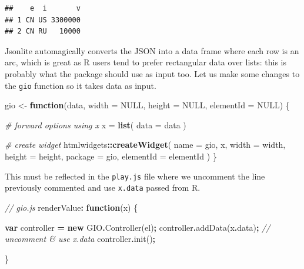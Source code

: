 \documentclass[
]{krantz}
\makeatletter
\newenvironment{Shaded}{\begin{snugshade}}{\end{snugshade}}
\newcommand{\AttributeTok}[1]{\textcolor[rgb]{0.61,0.61,0.61}{#1}}
\newcommand{\CommentTok}[1]{\textcolor[rgb]{0.37,0.37,0.37}{\textit{#1}}}
\newcommand{\ControlFlowTok}[1]{\textcolor[rgb]{0.27,0.27,0.27}{\textbf{#1}}}
\newcommand{\DataTypeTok}[1]{\textcolor[rgb]{0.27,0.27,0.27}{#1}}
\newcommand{\FunctionTok}[1]{\textcolor[rgb]{0,0,0}{#1}}
\newcommand{\KeywordTok}[1]{\textcolor[rgb]{0.27,0.27,0.27}{\textbf{#1}}}
\newcommand{\NormalTok}[1]{#1}
\newcommand{\OperatorTok}[1]{\textcolor[rgb]{0.43,0.43,0.43}{\textbf{#1}}}
\newcommand{\OtherTok}[1]{\textcolor[rgb]{0.37,0.37,0.37}{#1}}
\newcommand{\StringTok}[1]{\textcolor[rgb]{0.5,0.5,0.5}{#1}}
\newenvironment{kframe}{%
\medskip{}
\setlength{\fboxsep}{.8em}
 \def\at@end@of@kframe{}%
 \ifinner\ifhmode%
  \def\at@end@of@kframe{\end{minipage}}%
  \begin{minipage}{\columnwidth}%
 \fi\fi%
 \def\FrameCommand##1{\hskip\@totalleftmargin \hskip-\fboxsep
 \colorbox{shadecolor}{##1}\hskip-\fboxsep
     \hskip-\linewidth \hskip-\@totalleftmargin \hskip\columnwidth}%
 \MakeFramed {\advance\hsize-\width
   \@totalleftmargin\z@ \linewidth\hsize
   \@setminipage}}%
 {\par\unskip\endMakeFramed%
 \at@end@of@kframe}
\renewenvironment{Shaded}{\begin{kframe}}{\end{kframe}}
\makeatother
\begin{document}
\begin{verbatim}
##    e  i       v
## 1 CN US 3300000
## 2 CN RU   10000
\end{verbatim}

Jsonlite automagically converts the JSON into a data frame where each row is an arc, which is great as R users tend to prefer rectangular data over lists: this is probably what the package should use as input too. Let us make some changes to the \texttt{gio} function so it takes data as input.

\begin{Shaded}
\begin{Highlighting}[]
\NormalTok{gio \textless{}{-}}\StringTok{ }\ControlFlowTok{function}\NormalTok{(data, }\DataTypeTok{width =} \OtherTok{NULL}\NormalTok{, }\DataTypeTok{height =} \OtherTok{NULL}\NormalTok{, }\DataTypeTok{elementId =} \OtherTok{NULL}\NormalTok{) \{}

  \CommentTok{\# forward options using x}
\NormalTok{  x =}\StringTok{ }\KeywordTok{list}\NormalTok{(}
    \DataTypeTok{data =}\NormalTok{ data}
\NormalTok{  )}

  \CommentTok{\# create widget}
\NormalTok{  htmlwidgets}\OperatorTok{::}\KeywordTok{createWidget}\NormalTok{(}
    \DataTypeTok{name =} \StringTok{\textquotesingle{}gio\textquotesingle{}}\NormalTok{,}
\NormalTok{    x,}
    \DataTypeTok{width =}\NormalTok{ width,}
    \DataTypeTok{height =}\NormalTok{ height,}
    \DataTypeTok{package =} \StringTok{\textquotesingle{}gio\textquotesingle{}}\NormalTok{,}
    \DataTypeTok{elementId =}\NormalTok{ elementId}
\NormalTok{  )}
\NormalTok{\}}
\end{Highlighting}
\end{Shaded}

This must be reflected in the \texttt{play.js} file where we uncomment the line previously commented and use \texttt{x.data} passed from R.

\begin{Shaded}
\begin{Highlighting}[]
\CommentTok{// gio.js}
\NormalTok{renderValue}\OperatorTok{:} \KeywordTok{function}\NormalTok{(x) \{}

  \KeywordTok{var}\NormalTok{ controller }\OperatorTok{=} \KeywordTok{new}\NormalTok{ GIO}\OperatorTok{.}\FunctionTok{Controller}\NormalTok{(el)}\OperatorTok{;}
\NormalTok{  controller}\OperatorTok{.}\FunctionTok{addData}\NormalTok{(x}\OperatorTok{.}\AttributeTok{data}\NormalTok{)}\OperatorTok{;} \CommentTok{// uncomment \& use x.data}
\NormalTok{  controller}\OperatorTok{.}\FunctionTok{init}\NormalTok{()}\OperatorTok{;}

\NormalTok{\}}
\end{Highlighting}
\end{Shaded}
\end{document}
